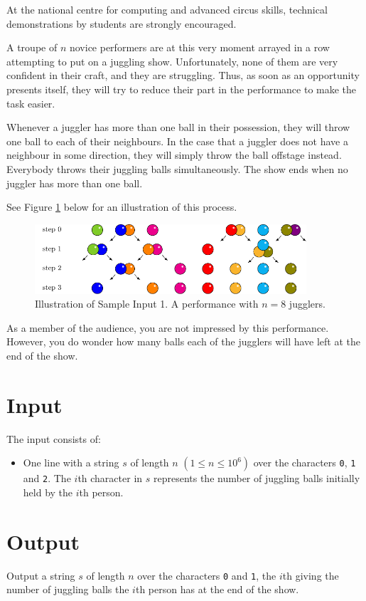 
At the national centre for computing and advanced circus skills, technical
demonstrations by students are strongly encouraged.

A troupe of $n$ novice performers are at this very moment arrayed in a row
attempting to put on a juggling show.
Unfortunately, none of them are very confident in their craft, and they are
struggling. Thus, as soon as an opportunity presents itself, they will try
to reduce their part in the performance to make the task easier.

Whenever a juggler has more than one ball in their possession, they will throw
one ball to each of their neighbours. In the case that a juggler does not have
a neighbour in some direction, they will simply throw the ball offstage instead.
Everybody throws their juggling balls simultaneously.
The show ends when no juggler has more than one ball.

See Figure \ref{fig:troupe} below for an illustration of this process.

\begin{figure}[h!]
  \centering
  \includegraphics[width=0.9\textwidth]{fig}
  \caption{Illustration of Sample Input 1.  A performance with $n = 8$ jugglers.}
  \label{fig:troupe}
\end{figure}

As a member of the audience, you are not impressed by this performance. However,
you do wonder how many balls each of the jugglers will have left at the end
of the show.

\section*{Input}
The input consists of:
\begin{itemize}
	\item One line with a string $s$ of length $n$ $(1 \leq n \leq 10^6)$ over the characters \texttt{0}, 
	\texttt{1} and \texttt{2}. The $i$th character in $s$ represents the number of juggling balls initially held by
the $i$th person.
\end{itemize}

\section*{Output}

Output a string $s$ of length $n$ over the characters \texttt{0} and \texttt{1},
the $i$th giving the number of juggling balls the $i$th person has at the end of the show.
